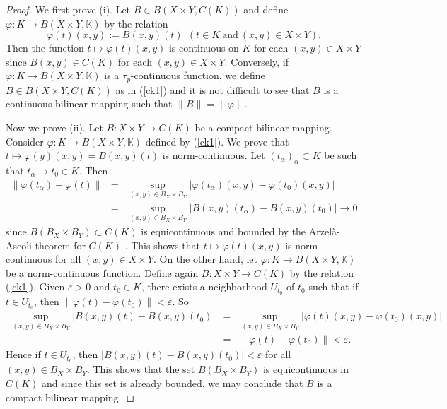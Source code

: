 \documentclass[12pt,a4paper]{amsart}
\theoremstyle{definition}
\newcommand{\e}{\varepsilon}
\numberwithin{equation}{section}
\newcommand{\K}{\mathbb{K}} %
\def\K{{\mathbb K}}
\begin{document}
\begin{proof} We first prove (i). Let $B \in B (X \times Y, C(K))$ and define $\varphi: K \longrightarrow B (X \times Y, \K)$ by the relation
	\begin{equation}
		\varphi(t)(x, y) := B(x, y)(t) \ \ \left( t \in K \ \mbox{and} \ (x, y) \in X \times Y \right).
		\label{ck1}
	\end{equation}
	Then the function $t \longmapsto \varphi(t)(x, y)$ is continuous on $K$ for each $(x, y) \in X \times Y$ since $B(x, y) \in C(K)$ for each $(x, y) \in X \times Y$. Conversely, if $\varphi: K \longrightarrow B (X \times Y, \K)$ is a $\tau_p$-continuous function, we define $B \in B (X \times Y, C(K))$ as in (\ref{ck1}) and it is not difficult to see that $B$ is a continuous bilinear mapping such that $\|B\| = \|\varphi\|$. 
	
	  Now we prove (ii). Let $B: X \times Y \longrightarrow C(K)$ be a compact bilinear mapping. Consider $\varphi: K \longrightarrow B (X \times Y, \K)$ defined by (\ref{ck1}). We prove that $t \longmapsto \varphi(y)(x, y) = B(x, y)(t)$
	is norm-continuous. Let $(t_{\alpha})_{\alpha} \subset K$ be such that $t_{\alpha} \longrightarrow t_0 \in K$. Then
	\begin{eqnarray*}
		\|\varphi(t_{\alpha}) - \varphi(t)\| &=& \sup_{(x, y) \in B_X \times B_Y} \left| \varphi(t_{\alpha})(x, y) - \varphi(t_0)(x, y) \right| \\
		&=& \sup_{(x, y) \in B_X \times B_Y} \left| B(x, y)(t_{\alpha}) - B(x, y)(t_0) \right| \longrightarrow 0
	\end{eqnarray*}
	since $B(B_X \times B_Y) \subset C(K)$ is equicontinuous and bounded by the Arzel\`{a}-Ascoli theorem for $C(K)$ \cite[Theorem 7, p.266]{DS}. This shows that $t \longmapsto \varphi(t)(x, y)$ is norm-continuous for all $(x, y) \in X \times Y$. On the other hand, let $\varphi: K \longrightarrow B (X \times Y, \K)$ be a norm-continuous function. Define again $B: X \times Y \longrightarrow C(K)$ by the relation (\ref{ck1}). Given $\e > 0$ and $t_0 \in K$, there exists a neighborhood $U_{t_0}$ of $t_0$ such that if $t \in U_{t_0}$, then $\|\varphi(t) - \varphi(t_0)\| < \e$. So
	\begin{eqnarray*}
		\sup_{(x, y) \in B_X \times B_Y} | B(x, y)(t) - B(x, y)(t_0)| &=& \sup_{(x, y) \in B_X \times B_Y} |\varphi(t)(x, y) - \varphi(t_0)(x, y)| \\
		&=& \|\varphi(t) - \varphi(t_0)\| < \e.
	\end{eqnarray*}
	Hence if $t \in U_{t_0}$, then $| B(x, y)(t) - B(x, y)(t_0)| < \e$ for all $(x, y) \in B_X \times B_Y$. This shows that the set $B(B_X \times B_Y)$ is equicontinuous in $C(K)$ and since this set is already bounded, we may conclude that $B$ is a compact bilinear mapping.
\end{proof} 
\end{document}
